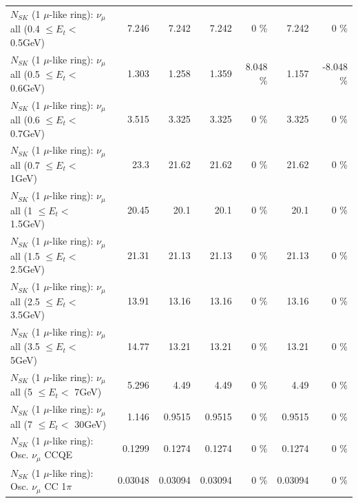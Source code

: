 \begin{table}
\begin{tabular}{| l | r | r | r  r | r  r |}
       $N_{SK}$ (1 $\mu$-like ring): $\nu_{\mu}$ all (0.4 $\leq E_{t} <$ 0.5GeV) &           7.246 &           7.242 &           7.242 &        0 \%  &           7.242 &        0 \%  \\ 
       $N_{SK}$ (1 $\mu$-like ring): $\nu_{\mu}$ all (0.5 $\leq E_{t} <$ 0.6GeV) &           1.303 &           1.258 &           1.359 &    8.048 \%  &           1.157 &   -8.048 \%  \\ 
       $N_{SK}$ (1 $\mu$-like ring): $\nu_{\mu}$ all (0.6 $\leq E_{t} <$ 0.7GeV) &           3.515 &           3.325 &           3.325 &        0 \%  &           3.325 &        0 \%  \\ 
         $N_{SK}$ (1 $\mu$-like ring): $\nu_{\mu}$ all (0.7 $\leq E_{t} <$ 1GeV) &            23.3 &           21.62 &           21.62 &        0 \%  &           21.62 &        0 \%  \\ 
         $N_{SK}$ (1 $\mu$-like ring): $\nu_{\mu}$ all (1 $\leq E_{t} <$ 1.5GeV) &           20.45 &            20.1 &            20.1 &        0 \%  &            20.1 &        0 \%  \\ 
       $N_{SK}$ (1 $\mu$-like ring): $\nu_{\mu}$ all (1.5 $\leq E_{t} <$ 2.5GeV) &           21.31 &           21.13 &           21.13 &        0 \%  &           21.13 &        0 \%  \\ 
       $N_{SK}$ (1 $\mu$-like ring): $\nu_{\mu}$ all (2.5 $\leq E_{t} <$ 3.5GeV) &           13.91 &           13.16 &           13.16 &        0 \%  &           13.16 &        0 \%  \\ 
         $N_{SK}$ (1 $\mu$-like ring): $\nu_{\mu}$ all (3.5 $\leq E_{t} <$ 5GeV) &           14.77 &           13.21 &           13.21 &        0 \%  &           13.21 &        0 \%  \\ 
           $N_{SK}$ (1 $\mu$-like ring): $\nu_{\mu}$ all (5 $\leq E_{t} <$ 7GeV) &           5.296 &            4.49 &            4.49 &        0 \%  &            4.49 &        0 \%  \\ 
          $N_{SK}$ (1 $\mu$-like ring): $\nu_{\mu}$ all (7 $\leq E_{t} <$ 30GeV) &           1.146 &          0.9515 &          0.9515 &        0 \%  &          0.9515 &        0 \%  \\ 
\hline
\hline
                               $N_{SK}$ (1 $\mu$-like ring): Osc. $\nu_\mu$ CCQE &          0.1299 &          0.1274 &          0.1274 &        0 \%  &          0.1274 &        0 \%  \\ 
                          $N_{SK}$ (1 $\mu$-like ring): Osc. $\nu_\mu$ CC 1$\pi$ &         0.03048 &         0.03094 &         0.03094 &        0 \%  &         0.03094 &        0 \%  \\ 

\end{tabular}
\end{table}

